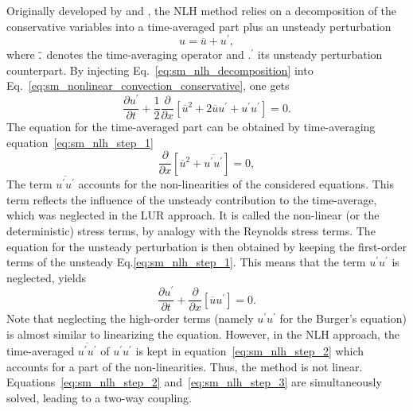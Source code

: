 
Originally developed by \citet{He1998} and \citet{Ning1998},
the NLH method
relies on a decomposition of the conservative variables into a
time-averaged part plus an unsteady perturbation
\begin{equation}
	u = \overline{u} + u^\prime,
	\label{eq:sm_nlh_decomposition}
\end{equation}
where $\overline{\vphantom{u}.}$ denotes the time-averaging operator and
$.^\prime$ its unsteady perturbation counterpart.
By injecting Eq.~\eqref{eq:sm_nlh_decomposition} into
Eq.~\eqref{eq:sm_nonlinear_convection_conservative}, one gets
\begin{equation}
	\frac{\partial u^\prime}{\partial t} + 
	\frac{1}{2}\frac{\partial}{\partial x} \left[
	\overline{u}^2 + 2 \overline{u} u^\prime + u^\prime u^\prime \right] = 
	0.
	\label{eq:sm_nlh_step_1}
\end{equation}
The equation for the time-averaged part can be obtained by time-averaging
equation~\eqref{eq:sm_nlh_step_1}
\begin{equation}
	\frac{\partial}{\partial x}
	\left[\overline{u}^2 + 
	\overline{u^\prime u^\prime}\right] =
	0,
	\label{eq:sm_nlh_step_2}
\end{equation}
The term $\overline{u^\prime u^\prime}$
accounts for the non-linearities of the considered equations. 
This term reflects the influence of the unsteady contribution to
the time-average, which was neglected in the LUR approach. It
is called the non-linear 
(or the deterministic) stress terms, by analogy with
the Reynolds stress terms. 
The equation for the unsteady perturbation is then obtained by keeping
the first-order terms of the unsteady Eq.\eqref{eq:sm_nlh_step_1}.
This means that the term $u^\prime u^\prime$ is neglected, yields
\begin{equation}
	\frac{\partial u^\prime}{\partial t} + 
	\frac{\partial}{\partial x} \left[\overline{u} u^\prime \right] = 
	0.
	\label{eq:sm_nlh_step_3}
\end{equation}
Note that neglecting the high-order terms 
(namely $u^\prime u^\prime$ for the Burger's equation) 
is almost similar to
linearizing the equation. However, in the NLH approach,
the time-averaged $\overline{u^\prime u^\prime}$ 
of $u^\prime u^\prime$ is kept in
equation~\eqref{eq:sm_nlh_step_2} which accounts for a part of the
non-linearities. Thus, the method is not linear. Equations~\eqref{eq:sm_nlh_step_2} 
and~\eqref{eq:sm_nlh_step_3} 
are simultaneously solved, leading to a two-way coupling.

